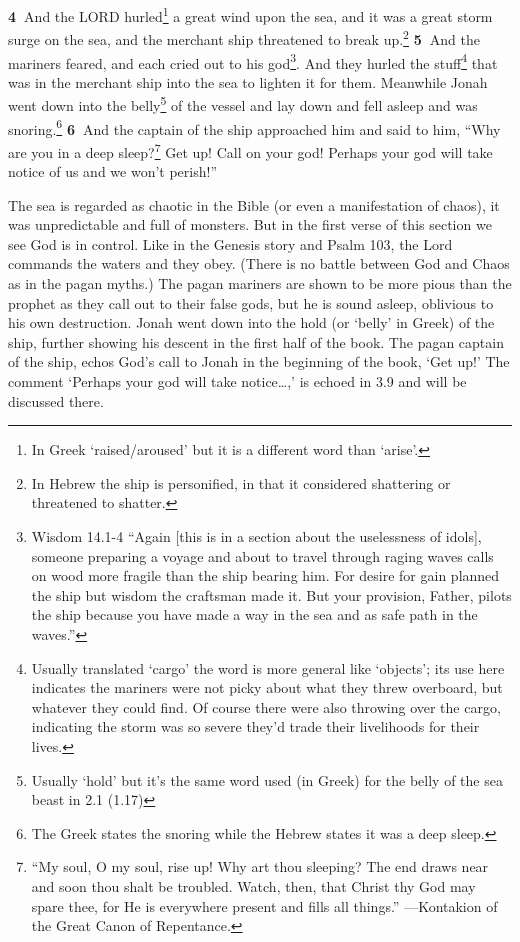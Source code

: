 \documentclass[
]{article}
\newcommand{\RL}[1]{\beginR #1\endR}
\begin{document}
\textbf{4~}And the LORD hurled\footnote{In Greek `raised/aroused' but it
  is a different word than `arise'.} a great wind upon the sea, and it
was a great storm surge on the sea, and the merchant ship threatened to
break up.\footnote{In Hebrew the ship is personified, in that it
  considered shattering or threatened to shatter.} \textbf{5~}And the
mariners feared, and each cried out to his god\footnote{Wisdom 14.1-4
  ``Again {[}this is in a section about the uselessness of idols{]},
  someone preparing a voyage and about to travel through raging waves
  calls on wood more fragile than the ship bearing him. For desire for
  gain planned the ship but wisdom the craftsman made it. But your
  provision, Father, pilots the ship because you have made a way in the
  sea and as safe path in the waves.''}. And they hurled the
stuff\footnote{Usually translated `cargo' the word is more general like
  `objects'; its use here indicates the mariners were not picky about
  what they threw overboard, but whatever they could find. Of course
  there were also throwing over the cargo, indicating the storm was so
  severe they'd trade their livelihoods for their lives.} that was in
the merchant ship into the sea to lighten it for them. Meanwhile Jonah
went down into the belly\footnote{Usually `hold' but it's the same word
  used (in Greek) for the belly of the sea beast in 2.1 (1.17)} of the
vessel and lay down and fell asleep and was snoring.\footnote{The Greek
  states the snoring while the Hebrew states it was a deep sleep.}
\textbf{6~}And the captain of the ship approached him and said to him,
\RL{``}Why are you in a deep sleep?\footnote{``My soul, O my soul, rise
  up! Why art thou sleeping? The end draws near and soon thou shalt be
  troubled. Watch, then, that Christ thy God may spare thee, for He is
  everywhere present and fills all things.'' ---Kontakion of the Great
  Canon of Repentance.} Get up! Call on your god! Perhaps your god will
take notice of us and we won\RL{'}t perish!''

The sea is regarded as chaotic in the Bible (or even a manifestation of
chaos), it was unpredictable and full of monsters. But in the first
verse of this section we see God is in control. Like in the Genesis
story and Psalm 103, the Lord commands the waters and they obey. (There
is no battle between God and Chaos as in the pagan myths.) The pagan
mariners are shown to be more pious than the prophet as they call out to
their false gods, but he is sound asleep, oblivious to his own
destruction. Jonah went down into the hold (or `belly' in Greek) of the
ship, further showing his descent in the first half of the book. The
pagan captain of the ship, echos God's call to Jonah in the beginning of
the book, `Get up!' The comment `Perhaps your god will take
notice\ldots,' is echoed in 3.9 and will be discussed there.
\end{document}

